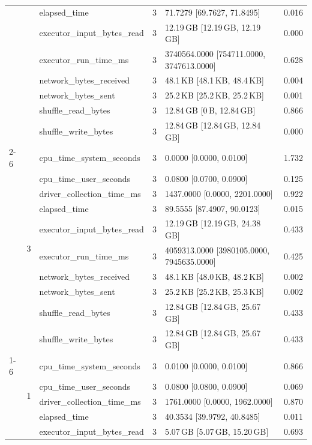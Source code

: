 \begin{tabular}{lllrll}
 &  & elapsed_time & 3 & 71.7279 [69.7627, 71.8495] & 0.016 \\
 &  & executor_input_bytes_read & 3 & 12.19\,GB [12.19\,GB, 12.19\,GB] & 0.000 \\
 &  & executor_run_time_ms & 3 & 3740564.0000 [754711.0000, 3747613.0000] & 0.628 \\
 &  & network_bytes_received & 3 & 48.1\,KB [48.1\,KB, 48.4\,KB] & 0.004 \\
 &  & network_bytes_sent & 3 & 25.2\,KB [25.2\,KB, 25.2\,KB] & 0.001 \\
 &  & shuffle_read_bytes & 3 & 12.84\,GB [0\,B, 12.84\,GB] & 0.866 \\
 &  & shuffle_write_bytes & 3 & 12.84\,GB [12.84\,GB, 12.84\,GB] & 0.000 \\
\cline{2-6}
 & \multirow[t]{10}{*}{3} & cpu_time_system_seconds & 3 & 0.0000 [0.0000, 0.0100] & 1.732 \\
 &  & cpu_time_user_seconds & 3 & 0.0800 [0.0700, 0.0900] & 0.125 \\
 &  & driver_collection_time_ms & 3 & 1437.0000 [0.0000, 2201.0000] & 0.922 \\
 &  & elapsed_time & 3 & 89.5555 [87.4907, 90.0123] & 0.015 \\
 &  & executor_input_bytes_read & 3 & 12.19\,GB [12.19\,GB, 24.38\,GB] & 0.433 \\
 &  & executor_run_time_ms & 3 & 4059313.0000 [3980105.0000, 7945635.0000] & 0.425 \\
 &  & network_bytes_received & 3 & 48.1\,KB [48.0\,KB, 48.2\,KB] & 0.002 \\
 &  & network_bytes_sent & 3 & 25.2\,KB [25.2\,KB, 25.3\,KB] & 0.002 \\
 &  & shuffle_read_bytes & 3 & 12.84\,GB [12.84\,GB, 25.67\,GB] & 0.433 \\
 &  & shuffle_write_bytes & 3 & 12.84\,GB [12.84\,GB, 25.67\,GB] & 0.433 \\
\cline{1-6} \cline{2-6}
\multirow[t]{30}{*}{national-scale-spatial-join-databricks-broadcast-16-nodes-medium} & \multirow[t]{10}{*}{1} & cpu_time_system_seconds & 3 & 0.0100 [0.0000, 0.0100] & 0.866 \\
 &  & cpu_time_user_seconds & 3 & 0.0800 [0.0800, 0.0900] & 0.069 \\
 &  & driver_collection_time_ms & 3 & 1761.0000 [0.0000, 1962.0000] & 0.870 \\
 &  & elapsed_time & 3 & 40.3534 [39.9792, 40.8485] & 0.011 \\
 &  & executor_input_bytes_read & 3 & 5.07\,GB [5.07\,GB, 15.20\,GB] & 0.693 \\

\end{tabular}

